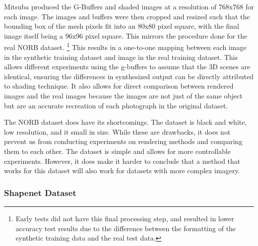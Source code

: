 \documentclass[10pt,twocolumn,letterpaper]{article}
\begin{document}
 Mitsuba produced the G-Buffers and shaded images at a resolution of 768x768 for each image.  The images and buffers were then cropped and resized such that the bounding box of the mesh pixels fit into an 80x80 pixel square, with the final image itself being a 96x96 pixel square. This mirrors the procedure done for the real NORB dataset.  \footnote{Early tests did not have this final processing step, and resulted in lower accuracy test results due to the difference between the formatting of the synthetic training data and the real test data.}
 This results in a one-to-one mapping between each image in the synthetic training dataset and image in the real training dataset.  This allows different experiments using the g-buffers to assume that the 3D scenes are identical, ensuring the differences in synthesized output can be directly attributed to shading technique. 
It also allows for direct comparison between rendered images and the real images because the images are not just of the same object but are an accurate recreation of each photograph in the original dataset.

 The NORB dataset does have its shortcomings. The dataset is black and white, low resolution, and it small in size. While these are drawbacks, it does not prevent us from conducting experiments on rendering methods and comparing them to each other.  The dataset is simple and allows for more controllable experiments.  However, it does make it harder to conclude that a method that works for this dataset will also work for datasets with more complex imagery.

%

\subsubsection{Shapenet Dataset}
\end{document}

